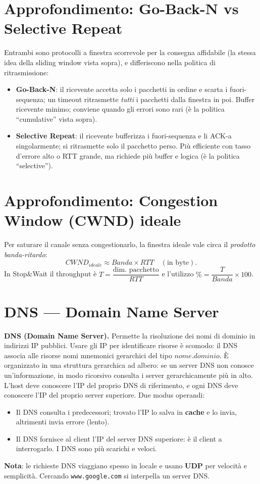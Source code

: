 \documentclass[11pt,a4paper]{report}
\newcommand{\pagemark}[1]{\marginpar{\footnotesize\color{gray}p.#1}}
\begin{document}
\section{Approfondimento: Go-Back-N vs Selective Repeat}
Entrambi sono protocolli a finestra scorrevole per la consegna affidabile (la stessa idea della sliding window vista sopra), e differiscono nella politica di ritrasmissione:
\begin{itemize}[noitemsep]
\item \textbf{Go-Back-N}: il ricevente accetta solo i pacchetti in ordine e scarta i fuori-sequenza; un timeout ritrasmette \emph{tutti} i pacchetti dalla finestra in poi. Buffer ricevente minimo; conviene quando gli errori sono rari (è la politica ``cumulative'' vista sopra).
\item \textbf{Selective Repeat}: il ricevente bufferizza i fuori-sequenza e li ACK-a singolarmente; si ritrasmette solo il pacchetto perso. Più efficiente con tasso d'errore alto o RTT grande, ma richiede più buffer e logica (è la politica ``selective'').
\end{itemize}



\section{Approfondimento: Congestion Window (CWND) ideale}
Per saturare il canale senza congestionarlo, la finestra ideale vale circa il \emph{prodotto banda-ritardo}:
\[ CWND_{ideale} \approx Banda \times RTT \quad (\text{in byte}). \]
In Stop\&Wait il throughput è $T = \dfrac{\text{dim. pacchetto}}{RTT}$ e l'utilizzo $\% = \dfrac{T}{Banda}\times100$.


\section{DNS — Domain Name Server}\pagemark{24}
\textbf{DNS (Domain Name Server).} Permette la risoluzione dei nomi di dominio in indirizzi IP pubblici. Usare gli IP per identificare risorse è scomodo: il DNS associa alle risorse nomi mnemonici gerarchici del tipo $nome.dominio$. È organizzato in una struttura gerarchica ad albero: se un server DNS non conosce un'informazione, in modo ricorsivo consulta i server gerarchicamente più in alto. L'host deve conoscere l'IP del proprio DNS di riferimento, e ogni DNS deve conoscere l'IP del proprio server superiore. Due modus operandi:
\begin{itemize}[noitemsep]
\item Il DNS consulta i predecessori; trovato l'IP lo salva in \textbf{cache} e lo invia, altrimenti invia errore (lento).
\item Il DNS fornisce al client l'IP del server DNS superiore: è il client a interrogarlo. I DNS sono più scarichi e veloci.
\end{itemize}
\textbf{Nota}: le richieste DNS viaggiano spesso in locale e usano \textbf{UDP} per velocità e semplicità. Cercando \texttt{www.google.com} si interpella un server DNS.
\end{document}
